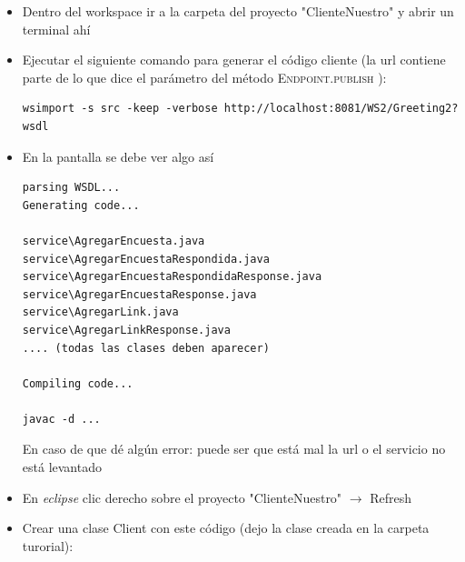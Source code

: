 \documentclass[12pt]{article}
\begin{document}
\begin{itemize}
\begin{minipage}[t]{\linewidth}
          \medskip
          \scriptsize En caso de que d\'e alg\'un error: puede ser que el puerto est\'e ocupado y haya que detener eso, aunque ac\'a se puede poner manualmente cualquier puerto cambiando el par\'ametro del m\'etodo \textsc{Endpoint.publish}.
    \end{minipage}
\item Dentro del workspace ir a la carpeta del proyecto "ClienteNuestro" y abrir un terminal ah\'i \newline
    \begin{minipage}[t]{\linewidth}
          \raggedright

          \medskip
    \end{minipage}
\item Ejecutar el siguiente comando para generar el c\'odigo cliente (la url contiene parte de lo que dice el par\'ametro del m\'etodo \textsc{Endpoint.publish} ):
\begin{verbatim}
wsimport -s src -keep -verbose http://localhost:8081/WS2/Greeting2?wsdl
\end{verbatim}
\item En la pantalla se debe ver algo as\'i
\begin{verbatim}
parsing WSDL...
Generating code...

service\AgregarEncuesta.java
service\AgregarEncuestaRespondida.java
service\AgregarEncuestaRespondidaResponse.java
service\AgregarEncuestaResponse.java
service\AgregarLink.java
service\AgregarLinkResponse.java
.... (todas las clases deben aparecer)

Compiling code...

javac -d ...
\end{verbatim}
{
 \scriptsize En caso de que d\'e alg\'un error: puede ser que est\'a mal la url o el servicio no est\'a levantado }
\item En \emph{eclipse} clic derecho sobre el proyecto "ClienteNuestro"  $\rightarrow$ Refresh
\item Crear una clase Client con este c\'odigo (dejo la clase creada en la carpeta turorial):
\scriptsize
\begin{verbatim}


\end{verbatim}
\end{itemize}
\end{document}
